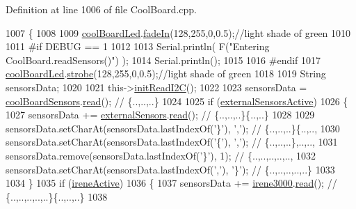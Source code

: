 Definition at line 1006 of file Cool\+Board.\+cpp.


\begin{DoxyCode}
1007 \{
1008 
1009     \hyperlink{class_cool_board_a1b1d3c684a5baa56b08486e192fd8e97}{coolBoardLed}.\hyperlink{class_cool_board_led_ab778f5e7bed0ab74e3906d82110493c3}{fadeIn}(128,255,0,0.5);\textcolor{comment}{//light shade of green}
1010                 
1011 \textcolor{preprocessor}{#if DEBUG == 1}
1012 
1013     Serial.println( F(\textcolor{stringliteral}{"Entering CoolBoard.readSensors()"}) );
1014     Serial.println();
1015 
1016 \textcolor{preprocessor}{#endif}
1017     \hyperlink{class_cool_board_a1b1d3c684a5baa56b08486e192fd8e97}{coolBoardLed}.\hyperlink{class_cool_board_led_ad5f0de4c628cbfbf49896042831c64ad}{strobe}(128,255,0,0.5);\textcolor{comment}{//light shade of green}
1018 
1019     String sensorsData;
1020     
1021     this->\hyperlink{class_cool_board_a397b46fadab8f530a8cf4d914c561366}{initReadI2C}();
1022 
1023     sensorsData = \hyperlink{class_cool_board_af102be5288bd7f7a8e59b13f86e26a00}{coolBoardSensors}.\hyperlink{class_cool_board_sensors_a91badb2539d91fda8679f2a597874c48}{read}(); \textcolor{comment}{// \{..,..,..\}}
1024     
1025     \textcolor{keywordflow}{if} (\hyperlink{class_cool_board_a638b00b76aeb819ecfd4c10b8cdd7bb7}{externalSensorsActive})
1026     \{
1027         sensorsData += \hyperlink{class_cool_board_a09e26264839c65873eb56af476eff6b2}{externalSensors}.\hyperlink{class_external_sensors_a53177b81eca3be89508b5511ddcd00fc}{read}(); \textcolor{comment}{// \{..,..,..\}\{..,..\}}
1028 
1029         sensorsData.setCharAt(sensorsData.lastIndexOf(\textcolor{charliteral}{'\}'}), \textcolor{charliteral}{','}); \textcolor{comment}{// \{..,..,..\}\{..,..,}
1030         sensorsData.setCharAt(sensorsData.lastIndexOf(\textcolor{charliteral}{'\{'}), \textcolor{charliteral}{','}); \textcolor{comment}{// \{..,..,..\},..,..,}
1031         sensorsData.remove(sensorsData.lastIndexOf(\textcolor{charliteral}{'\}'}), 1); \textcolor{comment}{// \{..,..,..,..,..,}
1032         sensorsData.setCharAt(sensorsData.lastIndexOf(\textcolor{charliteral}{','}), \textcolor{charliteral}{'\}'}); \textcolor{comment}{// \{..,..,..,..,..\}}
1033 
1034     \}
1035     \textcolor{keywordflow}{if} (\hyperlink{class_cool_board_a9c3f7ac625481ee2ae802a25d97a4ae0}{ireneActive})
1036     \{
1037         sensorsData += \hyperlink{class_cool_board_ad103718ce316006c4695b8eb312eaf11}{irene3000}.\hyperlink{class_irene3000_a852a170feea994ea1df01c6b245b5d9a}{read}(); \textcolor{comment}{// \{..,..,..,..,..\}\{..,..,..\}}
1038 

\end{DoxyCode}
